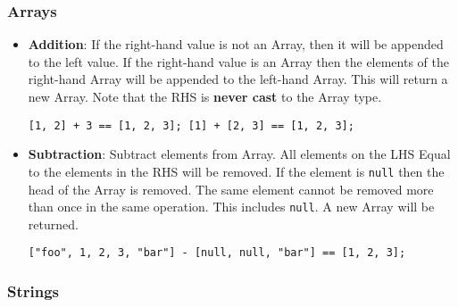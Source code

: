 \subsubsection{Arrays}

\begin{itemize}
    \item \textbf{Addition}: If the right-hand value is not an Array, then it will be appended to the left value. If the right-hand value is an Array then the elements of the right-hand Array will be appended to the left-hand Array. This will return a new Array. Note that the RHS is \textbf{never cast} to the Array type.
    \begin{verbatim}
[1, 2] + 3 == [1, 2, 3]; [1] + [2, 3] == [1, 2, 3];
    \end{verbatim}
    \item \textbf{Subtraction}: Subtract elements from Array. All elements on the LHS Equal to the elements in the RHS will be removed. If the element is \verb|null| then the head of the Array is removed. The same element cannot be removed more than once in the same operation. This includes \verb|null|. A new Array will be returned.
    \begin{verbatim}
["foo", 1, 2, 3, "bar"] - [null, null, "bar"] == [1, 2, 3];
    \end{verbatim}
\end{itemize}

\subsubsection{Strings}

